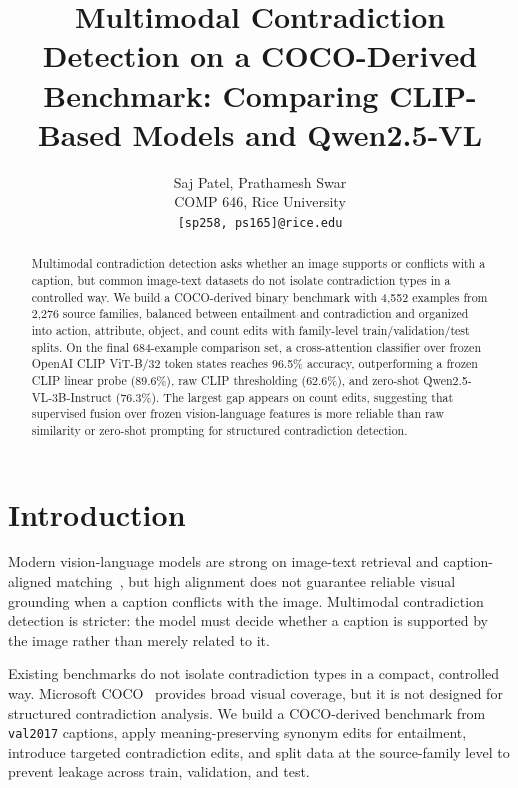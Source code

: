\documentclass[10pt,twocolumn,letterpaper]{article}
\begin{document}
\title{Multimodal Contradiction Detection on a COCO-Derived Benchmark: Comparing CLIP-Based Models and Qwen2.5-VL}

\author{Saj Patel, Prathamesh Swar\\
COMP 646, Rice University\\
{\tt\small [sp258, ps165]@rice.edu}
}

\maketitle

\begin{abstract}
Multimodal contradiction detection asks whether an image supports or conflicts with a caption, but common image-text datasets do not isolate contradiction types in a controlled way. We build a COCO-derived binary benchmark with 4,552 examples from 2,276 source families, balanced between entailment and contradiction and organized into action, attribute, object, and count edits with family-level train/validation/test splits. On the final 684-example comparison set, a cross-attention classifier over frozen OpenAI CLIP ViT-B/32 token states reaches 96.5\% accuracy, outperforming a frozen CLIP linear probe (89.6\%), raw CLIP thresholding (62.6\%), and zero-shot Qwen2.5-VL-3B-Instruct (76.3\%). The largest gap appears on count edits, suggesting that supervised fusion over frozen vision-language features is more reliable than raw similarity or zero-shot prompting for structured contradiction detection.
\end{abstract}
\vspace{-0.6em}

\section{Introduction}
\noindent
Modern vision-language models are strong on image-text retrieval and caption-aligned matching~\cite{radford2021learning}, but high alignment does not guarantee reliable visual grounding when a caption conflicts with the image. Multimodal contradiction detection is stricter: the model must decide whether a caption is supported by the image rather than merely related to it.

Existing benchmarks do not isolate contradiction types in a compact, controlled way. Microsoft COCO~\cite{lin2014microsoft} provides broad visual coverage, but it is not designed for structured contradiction analysis. We build a COCO-derived benchmark from \texttt{val2017} captions, apply meaning-preserving synonym edits for entailment, introduce targeted contradiction edits, and split data at the source-family level to prevent leakage across train, validation, and test.
\end{document}
